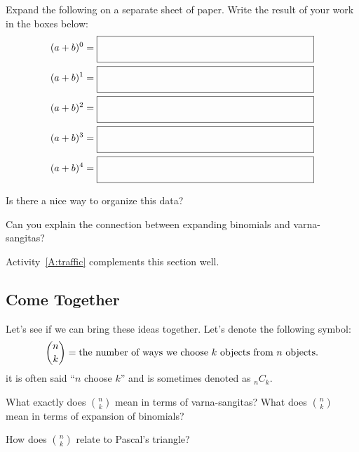 Expand the following on a separate sheet of paper. Write the result
of your work in the boxes below:
\begin{align*}
(a + b)^0 &=  \raisebox{-3mm}{\fbox{\rule[0mm]{0mm}{7mm}\hspace{50ex}}} \\
(a + b)^1 &=  \raisebox{-3mm}{\fbox{\rule[0mm]{0mm}{7mm}\hspace{50ex}}} \\
(a + b)^2 &=  \raisebox{-3mm}{\fbox{\rule[0mm]{0mm}{7mm}\hspace{50ex}}} \\
(a + b)^3 &=  \raisebox{-3mm}{\fbox{\rule[0mm]{0mm}{7mm}\hspace{50ex}}} \\
(a + b)^4 &=  \raisebox{-3mm}{\fbox{\rule[0mm]{0mm}{7mm}\hspace{50ex}}} 
\end{align*}

\begin{question} Is there a nice way to organize this data?
\end{question}
\QM

\begin{question}
Can you explain the connection between expanding binomials and
varna-sangitas?
\end{question}
\QM

\begin{activitynote}
Activity~\ref{A:traffic} complements this section well.  %
\end{activitynote}



\subsection{Come Together}

Let's see if we can bring these ideas together. Let's denote the following symbol:
\[
\binom{n}{k} = \text{the number of ways we choose $k$ objects from $n$
  objects}.\index{nchoosek@$\binom{n}{k}$}\index{nck@$_nC_k$}
\]
it is often said ``$n$ choose $k$'' and is sometimes denoted as $_n C_k$.

\begin{question}
What exactly does $\binom{n}{k}$ mean in terms of varna-sangitas? What
does $\binom{n}{k}$ mean in terms of expansion of binomials?
\end{question}
\QM

\begin{question} How does $\binom{n}{k}$ relate to Pascal's triangle?
\end{question}
\QM


